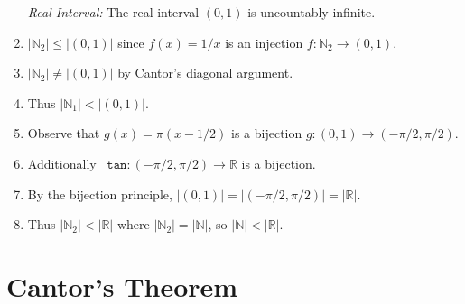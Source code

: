\documentclass[a4paper, 11pt]{article} %
\newcommand{\set}[1]{\lbrace#1\rbrace} %
\newcommand{\abs}[1]{|#1|} %
\newcommand{\N}{\mathbb{N}}
\newcommand{\R}{\mathbb{R}}
\begin{document}
\begin{enumerate}
\begin{enumerate}
  \item[\it Real Interval:] The real interval $(0,1)$ is uncountably infinite.
    \item $\abs{\N_2} \leq \abs{(0,1)}$ since $f(x) = 1/x$ is an injection $f: \N_2 \to (0,1)$.
    \item $\abs{\N_2} \neq \abs{(0,1)}$ by Cantor's diagonal argument.
    \item Thus $\abs{\N_1} < \abs{(0,1)}$.
    \item Observe that $g(x) = \pi(x - 1/2)$ is a bijection $g: (0,1) \to (-\pi/2,\pi/2)$. 
    \item Additionally~ $\texttt{tan}: (-\pi/2,\pi/2) \to \R$ is a bijection. 
    \item By the bijection principle, $\abs{(0,1)} = \abs{(-\pi/2,\pi/2)} = \abs{\R}$.
    \item Thus $\abs{\N_2} < \abs{\R}$ where $\abs{\N_2} = \abs{\N}$, so $\abs{\N} < \abs{\R}$.
\end{enumerate}



\section*{Cantor's Theorem}


\end{enumerate}
\end{document}
